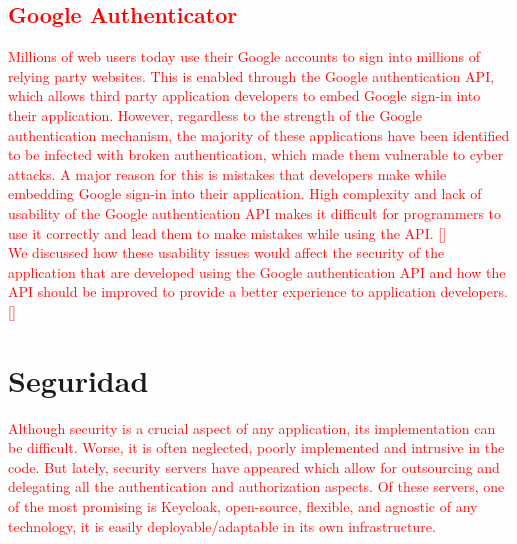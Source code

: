	\textcolor{red}{
	\subsection{Google Authenticator}
	Millions of web users today use their Google accounts to sign into millions of relying party websites. This is enabled through the Google authentication API, which allows third party application developers to embed Google sign-in into their application. However, regardless to the strength of the Google authentication mechanism, the majority of these applications have been identified to be infected with broken authentication, which made them vulnerable to cyber attacks. A major reason for this is mistakes that developers make while embedding Google sign-in into their application. High complexity and lack of usability of the Google authentication API makes it difficult for programmers to use it correctly and lead them to make mistakes while using the API. [\cite{wijayarathna2019empirical}]
	\\
	We discussed how these usability issues would affect the security of the application that are developed using the Google authentication API and how the API should be improved to provide a better experience to application developers. [\cite{wijayarathna2019empirical}]}

\section{Seguridad}
\textcolor{red}{
Although security is a crucial aspect of any application, its implementation can be difficult. Worse, it is often neglected, poorly implemented and intrusive in the code. But lately, security servers have appeared which allow for outsourcing and delegating all the authentication and authorization aspects. Of these servers, one of the most promising is Keycloak, open-source, flexible, and agnostic of any technology, it is easily deployable/adaptable in its own infrastructure.}
